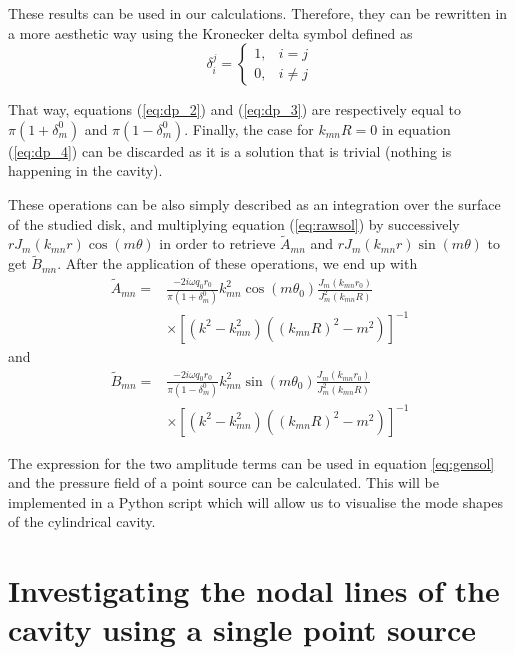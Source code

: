 \documentclass[%
 reprint,
 amsmath,amssymb,
 aip,
]{revtex4-1}
\begin{document}
These results can be used in our calculations. Therefore, they can be rewritten in a more aesthetic way using the Kronecker delta symbol defined as 
\begin{equation}
   \delta_i^j = \begin{cases}
       1, & i = j\\ 0, & i \ne j
   \end{cases} 
\end{equation}

That way, equations (\ref{eq:dp_2}) and (\ref{eq:dp_3}) are respectively equal to $\pi(1 + \delta_m^0)$ and $\pi(1 - \delta_m^0)$. Finally, the case for $k_{mn}R = 0$ in equation (\ref{eq:dp_4}) can be discarded as it is a solution that is trivial (nothing is happening in the cavity).

These operations can be also simply described as an integration over the surface of the studied disk, and multiplying equation (\ref{eq:rawsol}) by successively $r J_m(k_{mn}r) \cos(m\theta)$ in order to retrieve $\tilde{A}_{mn}$ and $r J_m(k_{mn}r) \sin(m\theta)$ to get $\tilde{B}_{mn}$. After the application of these operations, we end up with
\begin{equation}
    \begin{split}
        \tilde{A}_{mn} =& \frac{- 2 i \omega q_0 r_0}{\pi (1 + \delta_m^0)} k_{mn}^2  \cos(m \theta_0) \frac{J_m(k_{mn}r_0)}{J^2_m(k_{mn}R)}\\ &\times\left[(k^2 - k^2_{mn}) ((k_{mn}R)^2 - m^2)\right]^{-1}
    \end{split}
\end{equation}
and 
\begin{equation}
    \begin{split}
        \tilde{B}_{mn} =& \frac{- 2 i \omega q_0 r_0}{\pi (1 - \delta_m^0)} k_{mn}^2  \sin(m \theta_0) \frac{J_m(k_{mn}r_0)}{J^2_m(k_{mn}R)}\\ &\times\left[(k^2 - k^2_{mn}) ((k_{mn}R)^2 - m^2)\right]^{-1}
    \end{split}
\end{equation}

The expression for the two amplitude terms can be used in equation \ref{eq:gensol} and the pressure field of a point source can be calculated. This will be implemented in a Python script which will allow us to visualise the mode shapes of the cylindrical cavity.  

\section{Investigating the nodal lines of the cavity using a single point source}
\end{document}
